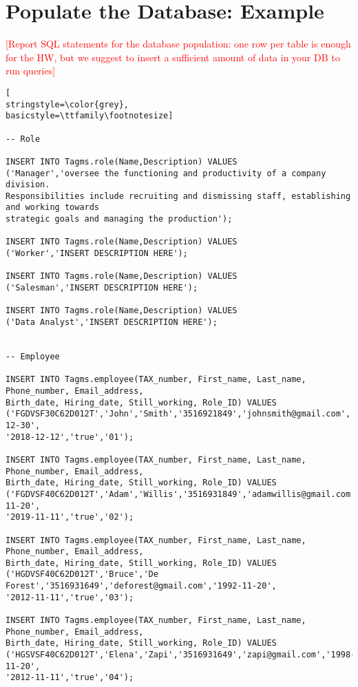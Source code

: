 
\section{Populate the Database: Example}
\textcolor{red}{[Report SQL statements for the database population: one row per table is enough for the HW, but we suggest to insert a sufficient amount of data in your DB to run queries]}


\begin{lstlisting}[
stringstyle=\color{grey},
basicstyle=\ttfamily\footnotesize]

-- Role

INSERT INTO Tagms.role(Name,Description) VALUES 
('Manager','oversee the functioning and productivity of a company division.
Responsibilities include recruiting and dismissing staff, establishing and working towards 
strategic goals and managing the production');

INSERT INTO Tagms.role(Name,Description) VALUES 
('Worker','INSERT DESCRIPTION HERE');

INSERT INTO Tagms.role(Name,Description) VALUES 
('Salesman','INSERT DESCRIPTION HERE');

INSERT INTO Tagms.role(Name,Description) VALUES 
('Data Analyst','INSERT DESCRIPTION HERE');


-- Employee

INSERT INTO Tagms.employee(TAX_number, First_name, Last_name, Phone_number, Email_address,
Birth_date, Hiring_date, Still_working, Role_ID) VALUES
('FGDVSF30C62D012T','John','Smith','3516921849','johnsmith@gmail.com','1995-12-30',
'2018-12-12','true','01');

INSERT INTO Tagms.employee(TAX_number, First_name, Last_name, Phone_number, Email_address,
Birth_date, Hiring_date, Still_working, Role_ID) VALUES
('FGDVSF40C62D012T','Adam','Willis','3516931849','adamwillis@gmail.com','1993-11-20',
'2019-11-11','true','02');

INSERT INTO Tagms.employee(TAX_number, First_name, Last_name, Phone_number, Email_address,
Birth_date, Hiring_date, Still_working, Role_ID) VALUES
('HGDVSF40C62D012T','Bruce','De Forest','3516931649','deforest@gmail.com','1992-11-20',
'2012-11-11','true','03');

INSERT INTO Tagms.employee(TAX_number, First_name, Last_name, Phone_number, Email_address,
Birth_date, Hiring_date, Still_working, Role_ID) VALUES
('HGSVSF40C62D012T','Elena','Zapi','3516931649','zapi@gmail.com','1998-11-20',
'2012-11-11','true','04');




\end{lstlisting}
